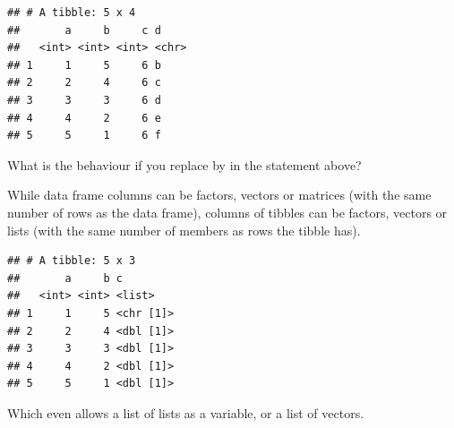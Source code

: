 \documentclass[krantz2]{krantz}\usepackage{knitr}%
\begin{document}
\begin{knitrout}\footnotesize
{}\color{fgcolor}\begin{kframe}
\begin{alltt}
\hlstd{(} \hlstd{=} \hlopt{:}\hlstd{,}  \hlstd{=} \hlopt{:}\hlstd{,}   \hlopt{+}   \hlstd{= letters[a} \hlopt{+} \hlstd{])}
\end{alltt}
\begin{verbatim}
## # A tibble: 5 x 4
##       a     b     c d    
##   <int> <int> <int> <chr>
## 1     1     5     6 b    
## 2     2     4     6 c    
## 3     3     3     6 d    
## 4     4     2     6 e    
## 5     5     1     6 f
\end{verbatim}
\end{kframe}
\end{knitrout}

\begin{playground}
What is the behaviour if you replace  by  in the statement above?
\end{playground}

While data frame columns can be factors, vectors or matrices (with the same number of rows as the data frame), columns of tibbles can be factors, vectors or lists (with the same number of members as rows the tibble has).

\begin{knitrout}\footnotesize
{}\color{fgcolor}\begin{kframe}
\begin{alltt}
\hlstd{(} \hlstd{=} \hlopt{:}\hlstd{,}  \hlstd{=} \hlopt{:}\hlstd{,}  \hlstd{=} \hlstd{(}\hlstd{,} \hlstd{,} \hlstd{,} \hlstd{,} \hlstd{))}
\end{alltt}
\begin{verbatim}
## # A tibble: 5 x 3
##       a     b c        
##   <int> <int> <list>   
## 1     1     5 <chr [1]>
## 2     2     4 <dbl [1]>
## 3     3     3 <dbl [1]>
## 4     4     2 <dbl [1]>
## 5     5     1 <dbl [1]>
\end{verbatim}
\end{kframe}
\end{knitrout}

Which even allows a list of lists as a variable, or a list of vectors.
\end{document}
